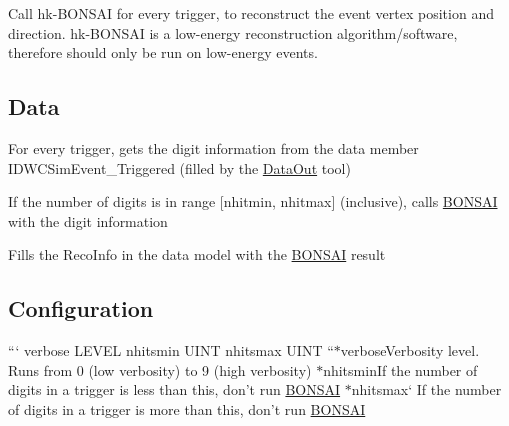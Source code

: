 Call hk-\/\-B\-O\-N\-S\-A\-I for every trigger, to reconstruct the event vertex position and direction. hk-\/\-B\-O\-N\-S\-A\-I is a low-\/energy reconstruction algorithm/software, therefore should only be run on low-\/energy events.

\subsection*{Data}


\begin{DoxyItemize}
\item For every trigger, gets the digit information from the data member {\ttfamily I\-D\-W\-C\-Sim\-Event\-\_\-\-Triggered} (filled by the \hyperlink{classDataOut}{Data\-Out} tool)
\begin{DoxyItemize}
\item If the number of digits is in range \mbox{[}{\ttfamily nhitmin}, {\ttfamily nhitmax}\mbox{]} (inclusive), calls \hyperlink{classBONSAI}{B\-O\-N\-S\-A\-I} with the digit information
\item Fills the {\ttfamily Reco\-Info} in the data model with the \hyperlink{classBONSAI}{B\-O\-N\-S\-A\-I} result
\end{DoxyItemize}
\end{DoxyItemize}

\subsection*{Configuration}

``` verbose L\-E\-V\-E\-L nhitsmin U\-I\-N\-T nhitsmax U\-I\-N\-T ``{\ttfamily  $\ast$}verbose{\ttfamily Verbosity level. Runs from 0 (low verbosity) to 9 (high verbosity) $\ast$}nhitsmin{\ttfamily If the number of digits in a trigger is less than this, don't run \hyperlink{classBONSAI}{B\-O\-N\-S\-A\-I} $\ast$}nhitsmax` If the number of digits in a trigger is more than this, don't run \hyperlink{classBONSAI}{B\-O\-N\-S\-A\-I} 